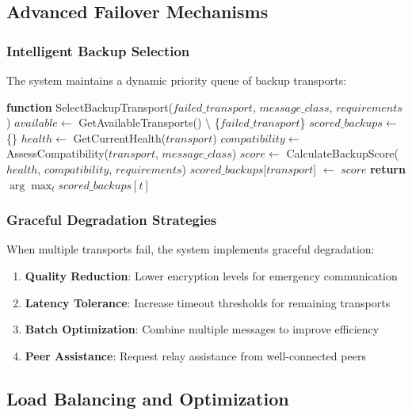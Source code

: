 \documentclass[11pt,a4paper]{article}
\theoremstyle{definition}
\theoremstyle{remark}
\begin{document}
\subsection{Advanced Failover Mechanisms}

\subsubsection{Intelligent Backup Selection}

The system maintains a dynamic priority queue of backup transports:

\begin{algorithm}
\caption{Dynamic Backup Selection}
\begin{algorithmic}[1]
\STATE \textbf{function} SelectBackupTransport($failed\_transport$, $message\_class$, $requirements$)
\STATE $available \leftarrow$ GetAvailableTransports() $\setminus$ \{$failed\_transport$\}
\STATE $scored\_backups \leftarrow$ \{\}
    \STATE $health \leftarrow$ GetCurrentHealth($transport$)
    \STATE $compatibility \leftarrow$ AssessCompatibility($transport$, $message\_class$)
    \STATE $score \leftarrow$ CalculateBackupScore($health$, $compatibility$, $requirements$)
    \STATE $scored\_backups$[$transport$] $\leftarrow$ $score$
\ENDFOR
\STATE \textbf{return} $\arg\max_{t} scored\_backups[t]$
\end{algorithmic}
\end{algorithm}

\subsubsection{Graceful Degradation Strategies}

When multiple transports fail, the system implements graceful degradation:

\begin{enumerate}
    \item \textbf{Quality Reduction}: Lower encryption levels for emergency communication
    \item \textbf{Latency Tolerance}: Increase timeout thresholds for remaining transports
    \item \textbf{Batch Optimization}: Combine multiple messages to improve efficiency
    \item \textbf{Peer Assistance}: Request relay assistance from well-connected peers
\end{enumerate}

\subsection{Load Balancing and Optimization}
\end{document}
